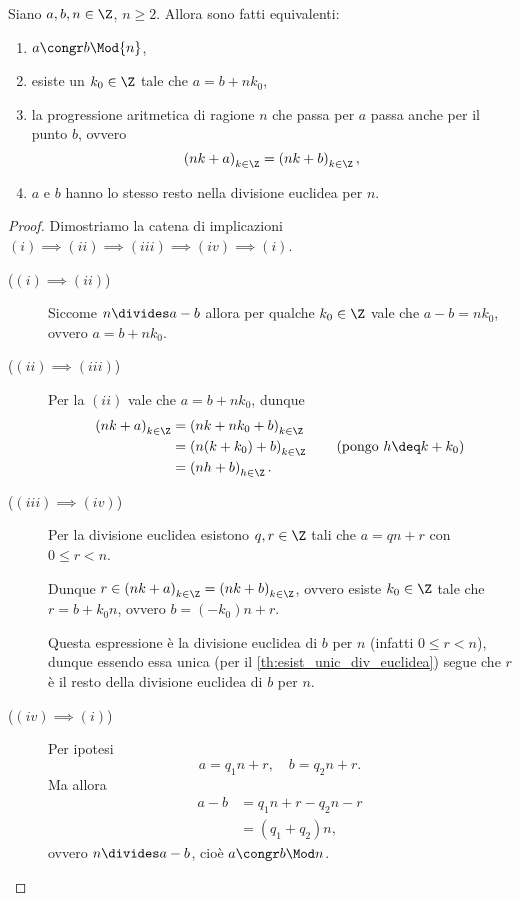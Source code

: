\begin{proposition} \label{prop:caratt_congr}
    Siano $a, b, n \in \Z$, $n \geq 2$. Allora sono fatti equivalenti:
    \begin{enumerate}[label={(\roman*)}]
        \item $a \congr b \Mod{n}$,
        \item esiste un $k_0 \in \Z$ tale che $a = b + nk_0$,
        \item la progressione aritmetica di ragione $n$ che passa per $a$ passa anche per il punto $b$, ovvero \[
            \left(nk + a\right)_{k \in \Z} = \left(nk + b\right)_{k \in \Z},
        \]
        \item $a$ e $b$ hanno lo stesso resto nella divisione euclidea per $n$.
    \end{enumerate}
\end{proposition}
\begin{proof}
    Dimostriamo la catena di implicazioni $(i) \implies (ii) \implies (iii) \implies (iv) \implies (i)$.
    \begin{description}
        \item[($(i) \implies (ii)$)] Siccome $n \divides a-b$ allora per qualche $k_0 \in \Z$ vale che $a-b = nk_0$, ovvero $a = b + nk_0$.
        \item[($(ii) \implies (iii)$)] Per la $(ii)$ vale che $a = b+nk_0$, dunque \begin{align*}
            \left(nk + a\right)_{k \in \Z} &= \left(nk + nk_0 + b\right)_{k \in \Z} \\
            &= \left(n(k + k_0) + b\right)_{k \in \Z} \tag{pongo $h \deq k + k_0$}\\
            &= \left(nh + b\right)_{h \in \Z}.
        \end{align*}
        \item[($(iii) \implies (iv)$)] Per la divisione euclidea esistono $q, r \in \Z$ tali che $a = qn + r$ con $0 \leq r < n$.
        
        Dunque $r \in \left(nk + a\right)_{k \in \Z} = \left(nk + b\right)_{k \in \Z}$, ovvero esiste $k_0 \in \Z$ tale che $r = b + k_0n$, ovvero $b = (-k_0)n + r$. 

        Questa espressione è la divisione euclidea di $b$ per $n$ (infatti $0 \leq r < n$), dunque essendo essa unica (per il \autoref{th:esist_unic_div_euclidea}) segue che $r$ è il resto della divisione euclidea di $b$ per $n$.
        \item[($(iv) \implies (i)$)] Per ipotesi \[
            a = q_1n + r, \quad b = q_2n + r.    
        \] Ma allora \begin{align*}
            a - b &= q_1n + r - q_2n - r\\
            &= (q_1 + q_2)n,
        \end{align*} ovvero $n \divides a - b$, cioè $a \congr b \Mod n$. \qedhere
    \end{description}
\end{proof}

